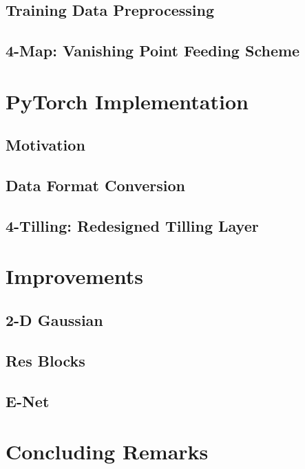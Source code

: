 \begin{spacing}{1.5}
\subsection{Training Data Preprocessing}

\subsection{4-Map: Vanishing Point Feeding Scheme}


\section{PyTorch Implementation}
\label{sec:MD_PyTorch}

\subsection{Motivation}

\subsection{Data Format Conversion}

\subsection{4-Tilling: Redesigned Tilling Layer}



\section{Improvements}
\label{sec:MD_improvement}
\setlength{\parskip}{0.3in}

\subsection{2-D Gaussian}
\label{subsec:IM_2D}

\subsection{Res Blocks}
\label{subsec:IM_resblock}

\subsection{E-Net}
\label{subsec:IM_Enet}



\section{Concluding Remarks}




\end{spacing}
\newpage
